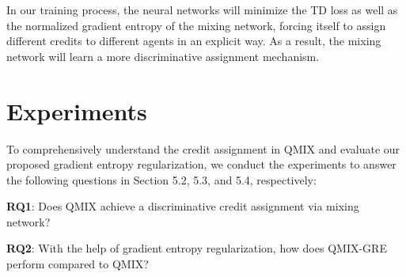 \begin{table}[htbp]
\centering
{}
\caption{The percentiles of gradient entropy of QMIX.
The data is collected during the whole training process and sorted from smallest to largest.
$i^{th}$ percentile value represents the $i\%$ smallest value in the data.
In all our experimental environments, the $25^{th}$ percentile of gradient entropy value is close to 1.
Since the maximum entropy means equal probability, the results here reveals the limited discriminablity of credit assignment in QMIX.}
\label{qmix_entropy_quantile}
\end{table}

In our training process, the neural networks will minimize the TD loss as well as the normalized gradient entropy of the mixing network, forcing itself to assign different credits to different agents in an explicit way.
As a result, the mixing network will learn a more discriminative assignment mechanism.

\section{Experiments}
To comprehensively understand the credit assignment in QMIX and evaluate our proposed gradient entropy regularization, we conduct the experiments to answer the following questions in Section 5.2, 5.3, and 5.4, respectively:

\textbf{RQ1}: Does QMIX achieve a discriminative credit assignment via mixing network?

\textbf{RQ2}: With the help of gradient entropy regularization, how does QMIX-GRE perform compared to QMIX?

